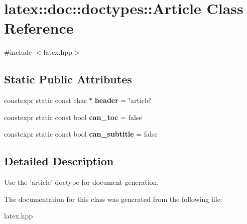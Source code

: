 \hypertarget{classlatex_1_1doc_1_1doctypes_1_1Article}{\section{latex\-:\-:doc\-:\-:doctypes\-:\-:\-Article \-Class \-Reference}
\label{classlatex_1_1doc_1_1doctypes_1_1Article}
}


{\ttfamily \#include $<$latex.\-hpp$>$}

\subsection*{\-Static \-Public \-Attributes}
\begin{DoxyCompactItemize}
\item 
\hypertarget{classlatex_1_1doc_1_1doctypes_1_1Article_a13ce4dd5c712f498e99029a8e8dc77b3}{constexpr static const char $\ast$ {\bfseries header} = \char`\"{}article\char`\"{}}\label{classlatex_1_1doc_1_1doctypes_1_1Article_a13ce4dd5c712f498e99029a8e8dc77b3}

\item 
\hypertarget{classlatex_1_1doc_1_1doctypes_1_1Article_ae8a3378f1d947c6300c7a6d8a01e09fc}{constexpr static const bool {\bfseries can\-\_\-toc} = false}\label{classlatex_1_1doc_1_1doctypes_1_1Article_ae8a3378f1d947c6300c7a6d8a01e09fc}

\item 
\hypertarget{classlatex_1_1doc_1_1doctypes_1_1Article_a7dc7e13e28ac8c09d92e367a1c470a27}{constexpr static const bool {\bfseries can\-\_\-subtitle} = false}\label{classlatex_1_1doc_1_1doctypes_1_1Article_a7dc7e13e28ac8c09d92e367a1c470a27}

\end{DoxyCompactItemize}


\subsection{\-Detailed \-Description}
\-Use the 'article' doctype for document generation. 

\-The documentation for this class was generated from the following file\-:\begin{DoxyCompactItemize}
\item 
latex.\-hpp\end{DoxyCompactItemize}
